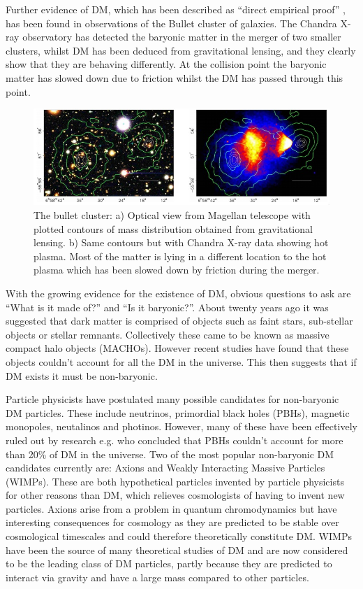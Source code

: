 \documentclass[a4paper,12pt]{article}
\begin{document}
Further evidence of DM, which has been described as ``direct empirical proof'' \citep{clowe}, has been found in observations of the Bullet cluster of galaxies. The Chandra X-ray observatory 
has detected the baryonic matter in the merger of two smaller clusters, whilst DM has been deduced from gravitational lensing, and they clearly show that they are behaving differently.
At the collision point the baryonic matter has slowed down due to friction whilst the DM has passed through this point.
\begin{figure}[H]
\centering
\includegraphics[width=.9\textwidth]{./bullet.jpg}
\caption{The bullet cluster: a) Optical view from Magellan telescope with plotted contours of mass distribution obtained from gravitational lensing.
b) Same contours but with Chandra X-ray data showing hot plasma. Most of the matter is lying in a different location to the hot plasma which has been slowed down by friction 
during the merger. \citep{clowe}}
\label{fig:2}
\end{figure}

With the growing evidence for the existence of DM, obvious questions to ask are ``What is it made of?'' and ``Is it baryonic?''. About twenty years ago it was suggested that dark matter is
comprised of objects such as faint stars, sub-stellar objects or stellar remnants. Collectively these came to be known as massive compact halo objects (MACHOs). However recent studies 
\citep{freese} have found that these objects couldn't account for all the DM in the universe. This then suggests that if DM exists it must be non-baryonic.

Particle physicists have postulated many possible candidates for non-baryonic DM particles. These include neutrinos, primordial black holes (PBHs), magnetic monopoles, neutalinos and photinos.
However, many of these have been effectively ruled out by research e.g. \cite{gaggero} who concluded that PBHs couldn't account for more than 20\% of DM in the universe.
Two of the most popular non-baryonic DM candidates currently are: Axions and Weakly Interacting Massive Particles (WIMPs). These are both hypothetical particles invented by particle 
physicists for other reasons than DM, which relieves cosmologists of having to invent new particles. Axions arise from a problem in quantum chromodynamics but have interesting 
consequences for cosmology as they are predicted to be stable over cosmological timescales \citep{bertone1} and could therefore theoretically constitute DM. WIMPs have been the source
of many theoretical studies of DM and are now considered to be the leading class of DM particles, partly because they are predicted to interact via gravity and have a large mass
compared to other particles.
\end{document}
